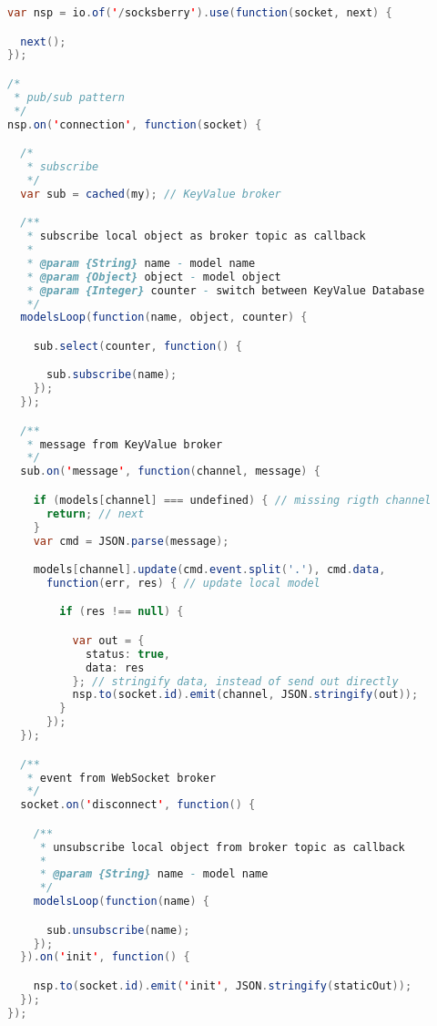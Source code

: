 \begin{lstlisting}[language=java, captionpos=b, caption={Doppio broker HTTP: KeyValue e WebSocket}, basicstyle=\scriptsize\ttfamily]
var nsp = io.of('/socksberry').use(function(socket, next) {

  next();
});

/*
 * pub/sub pattern
 */
nsp.on('connection', function(socket) {

  /*
   * subscribe
   */
  var sub = cached(my); // KeyValue broker

  /**
   * subscribe local object as broker topic as callback
   *
   * @param {String} name - model name
   * @param {Object} object - model object
   * @param {Integer} counter - switch between KeyValue Database
   */
  modelsLoop(function(name, object, counter) {

    sub.select(counter, function() {

      sub.subscribe(name);
    });
  });

  /**
   * message from KeyValue broker
   */
  sub.on('message', function(channel, message) {

    if (models[channel] === undefined) { // missing rigth channel
      return; // next
    }
    var cmd = JSON.parse(message);

    models[channel].update(cmd.event.split('.'), cmd.data,
      function(err, res) { // update local model

        if (res !== null) {

          var out = {
            status: true,
            data: res
          }; // stringify data, instead of send out directly
          nsp.to(socket.id).emit(channel, JSON.stringify(out));
        }
      });
  });

  /**
   * event from WebSocket broker
   */
  socket.on('disconnect', function() {

    /**
     * unsubscribe local object from broker topic as callback
     *
     * @param {String} name - model name
     */
    modelsLoop(function(name) {

      sub.unsubscribe(name);
    });
  }).on('init', function() {

    nsp.to(socket.id).emit('init', JSON.stringify(staticOut));
  });
});
\end{lstlisting}
